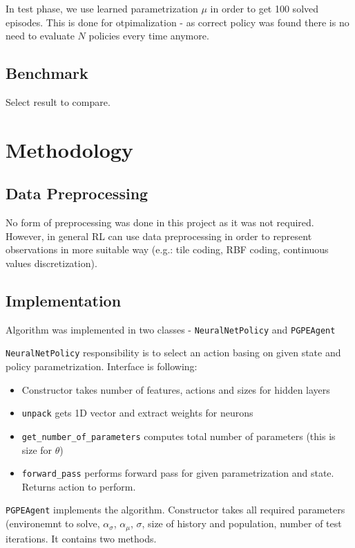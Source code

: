 \documentclass[12pt]{article}
\begin{document}
In test phase, we use learned parametrization $\mu$ in order to get 100 solved episodes. This is done for otpimalization - as correct policy was found there is no need to evaluate $N$ policies every time anymore.


\subsection{Benchmark}

Select result to compare.

\section{Methodology}
\subsection{Data Preprocessing}

No form of preprocessing was done in this project as it was not required. However, in general RL can use data preprocessing in order to represent observations in more suitable way (e.g.: tile coding, RBF coding, continuous values discretization).

\subsection{Implementation}

Algorithm was implemented in two classes - \texttt{NeuralNetPolicy} and \texttt{PGPEAgent}

\texttt{NeuralNetPolicy} responsibility is to select an action basing on given state and policy parametrization. Interface is following:

\begin{itemize}
\item  Constructor takes number of features, actions and sizes for hidden layers

\item \texttt{unpack} gets 1D vector and extract weights for neurons 

\item \texttt{get\_number\_of\_parameters} computes total number of parameters (this is size for $\theta$)

\item \texttt{forward\_pass} performs forward pass for given parametrization and state. Returns action to perform.
\end{itemize}

\texttt{PGPEAgent} implements the algorithm. Constructor takes all required parameters (environemnt to solve, $\alpha_\sigma$, $\alpha_\mu$, $\sigma$, size of history and population, number of test iterations. It contains two methods.
\end{document}
